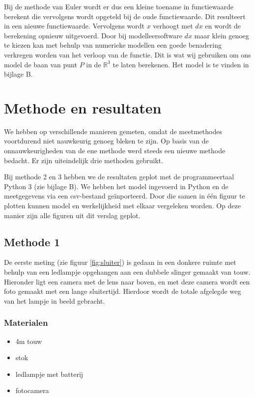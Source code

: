 \documentclass[a4paper]{article}
\begin{document}
	Bij de methode van Euler wordt er dus een kleine toename in functiewaarde berekent die vervolgens wordt opgeteld bij de oude functiewaarde. Dit resulteert in een nieuwe functiewaarde. Vervolgens wordt $x$ verhoogt met $dx$ en wordt de berekening opnieuw uitgevoerd. Door bij modelleersoftware $dx$ maar klein genoeg te kiezen kan met behulp van numerieke modellen een goede benadering verkregen worden van het verloop van de functie. Dit is wat wij gebruiken om ons model de baan van punt $P$ in de $\mathbb{R}^3$ te laten berekenen. Het model is te vinden in bijlage B. 
	
	
	
	\section{Methode en resultaten}
	
	We hebben op verschillende manieren gemeten, omdat de meetmethodes voortdurend niet nauwkeurig genoeg bleken te zijn. Op basis van de onnauwkeurigheden van de ene methode werd steeds een nieuwe methode bedacht. Er zijn uiteindelijk drie methoden gebruikt.
	
	Bij methode 2 en 3 hebben we de resultaten geplot met de programmeertaal Python 3 (zie bijlage B). We hebben het model ingevoerd in Python en de meetgegevens via een csv-bestand geïnporteerd. Door die samen in één figuur te plotten kunnen model en werkelijkheid met elkaar vergeleken worden. Op deze manier zijn alle figuren uit dit verslag geplot. 
	
	\subsection{Methode 1}
	\label{met1}	
	De eerste meting (zie figuur \ref{fig:sluiter}) is gedaan in een donkere ruimte met behulp van een ledlampje opgehangen aan een dubbele slinger gemaakt van touw. Hieronder ligt een camera met de lens naar boven, en met deze camera wordt een foto gemaakt met een lange sluitertijd. Hierdoor wordt de totale afgelegde weg van het lampje in beeld gebracht.
	
	\subsubsection*{Materialen}
	\begin{itemize}
		\setlength\itemsep{0em}
		\item 4m touw
		\item stok
		\item ledlampje met batterij
		\item fotocamera
	\end{itemize}
	
\end{document}
